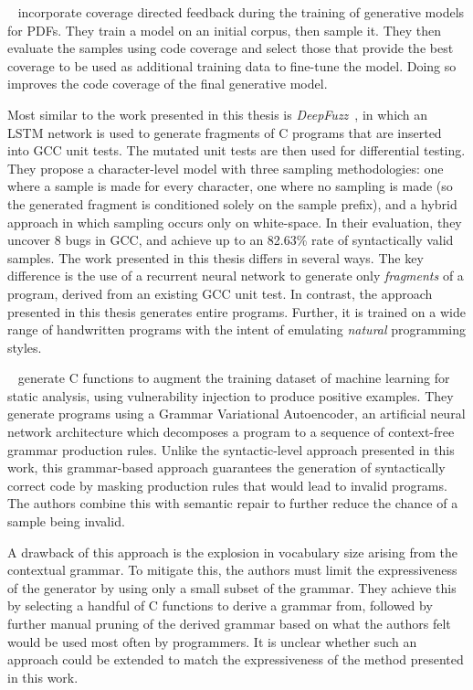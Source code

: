 \citeauthor{Jitsunari2019}~\cite{Jitsunari2019} incorporate coverage directed feedback during the training of generative models for PDFs. They train a model on an initial corpus, then sample it. They then evaluate the samples using code coverage and select those that provide the best coverage to be used as additional training data to fine-tune the model. Doing so improves the code coverage of the final generative model.

Most similar to the work presented in this thesis is \emph{DeepFuzz}~\cite{Liu2019}, in which an LSTM network is used to generate fragments of C programs that are inserted into GCC unit tests. The mutated unit tests are then used for differential testing. They propose a character-level model with three sampling methodologies: one where a sample is made for every character, one where no sampling is made (so the generated fragment is conditioned solely on the sample prefix), and a hybrid approach in which sampling occurs only on white-space. In their evaluation, they uncover 8 bugs in GCC, and achieve up to an 82.63\% rate of syntactically valid samples. The work presented in this thesis differs in several ways. The key difference is the use of a recurrent neural network to generate only \emph{fragments} of a program, derived from an existing GCC unit test. In contrast, the approach presented in this thesis generates entire programs. Further, it is trained on a wide range of handwritten programs with the intent of emulating \emph{natural} programming styles.

\citeauthor{Kosta2019}~\cite{Kosta2019} generate C functions to augment the training dataset of machine learning for static analysis, using vulnerability injection to produce positive examples. They generate programs using a Grammar Variational Autoencoder, an artificial neural network architecture which decomposes a program to a sequence of context-free grammar production rules. Unlike the syntactic-level approach presented in this work, this grammar-based approach guarantees the generation of syntactically correct code by masking production rules that would lead to invalid programs. The authors combine this with semantic repair to further reduce the chance of a sample being invalid.

A drawback of this approach is the explosion in vocabulary size arising from the contextual grammar. To mitigate this, the authors must limit the expressiveness of the generator by using only a small subset of the grammar. They achieve this by selecting a handful of C functions to derive a grammar from, followed by further manual pruning of the derived grammar based on what the authors felt would be used most often by programmers. It is unclear whether such an approach could be extended to match the expressiveness of the method presented in this work.

